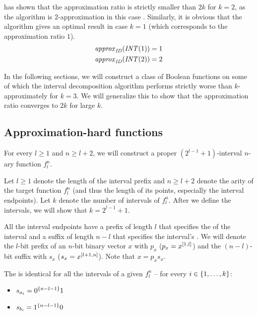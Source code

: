 \citeauthor{Dubovsky2012} has shown
that the approximation ratio is strictly smaller than $2k$
for $k = 2$,
as the algorithm is $2$-approximation
in this case \citep[p.~39]{Dubovsky2012}. %
Similarly,
it is obvious that the algorithm
gives an optimal result in case $k = 1$
(which corresponds to the approximation ratio $1$).
\begin{align*}
\mathit{approx}_{\mathit{ID}} (\mathit{INT} (1)) &= 1 \\
\mathit{approx}_{\mathit{ID}} (\mathit{INT} (2)) &= 2
\end{align*}

In the following sections,
we will construct a class of Boolean functions
on some of which
the interval decomposition algorithm
performs strictly worse than $k$-approximately
for $k = 3$.
We will generalize this to show
that the approximation ratio converges to $2k$
for large $k$.

\subsection{Approximation-hard functions}

For every $l \geq 1$ and $n \geq l+2$,
we will construct
a proper $(2^{l-1} + 1)$-interval $n$-ary function $f_l^n$.

Let $l \geq 1$
denote the length of the interval  prefix
and $n \geq l+2$
denote the arity of the target function $f_l^n$
(and thus the length of its points,
especially the interval endpoints).
Let $k$ denote the number of intervals of $f_l^n$.
After we define the intervals,
we will show that $k = 2^{l-1} + 1$.

All the interval endpoints have a prefix of length $l$
that specifies the  of the interval
and a suffix of length $n - l$
that specifies the interval's .
We will denote the $l$-bit  prefix
of an $n$-bit binary vector $x$ with $p_x$
($p_x = x^{[1, l]}$)
and the $(n-l)$-bit  suffix with $s_x$
($s_x = x^{[l+1, n]}$).
Note that $x = p_x s_x$.

The  is identical for all the intervals
of a given $f_l^n$
-- for every $i \in \{1, \ldots, k\}$:

\begin{itemize}
\item $s_{a_i} = 0^{\{n-l-1\}} 1$
\item $s_{b_i} = 1^{\{n-l-1\}} 0$
\end{itemize}


